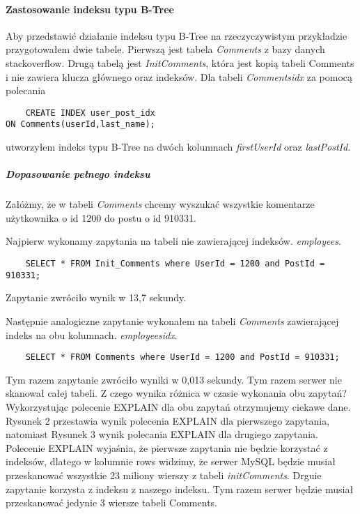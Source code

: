 \paragraph{Zastosowanie indeksu typu B-Tree}\mbox{}

Aby przedstawić działanie indeksu typu B-Tree na rzeczyczywistym przykładzie przygotowałem dwie tabele. Pierwszą jest tabela \textit{Comments} z bazy danych stackoverflow. Drugą tabelą jest \textit{Init\textunderscore Comments}, która jest kopią tabeli Comments i nie zawiera klucza głównego oraz indeksów.
Dla tabeli \textit{Comments\textunderscore idx} za pomocą polecania \begin{verbatim}
    CREATE INDEX user_post_idx 
ON Comments(userId,last_name);
\end{verbatim}
utworzyłem indeks typu B-Tree na dwóch kolumnach \textit{first\textunderscore UserId} oraz \textit{last\textunderscore PostId}.

\subparagraph{Dopasowanie pełnego indeksu}\mbox{}

Załóżmy, że w tabeli \textit{Comments} chcemy wyszukać wszystkie komentarze użytkownika o id 1200 do postu o id 910331.

Najpierw wykonamy zapytania na tabeli nie zawierającej indeksów.
 \textit{employees}. 
\begin{verbatim}
    SELECT * FROM Init_Comments where UserId = 1200 and PostId = 910331;
\end{verbatim}
Zapytanie zwróciło wynik w 13,7 sekundy.

Następnie analogiczne zapytanie wykonałem na tabeli \textit{Comments} zawierającej indeks na obu kolumnach.
\textit{employees\textunderscore idx}. 
\begin{verbatim}
    SELECT * FROM Comments where UserId = 1200 and PostId = 910331;
\end{verbatim}
Tym razem zapytanie zwróciło wyniki w 0,013 sekundy. Tym razem serwer nie skanował całej tabeli. Z czego wynika różnica w czasie wykonania obu zapytań? Wykorzystując polecenie EXPLAIN dla obu zapytań otrzymujemy ciekawe dane. Rysunek 2 przestawia wynik polecenia EXPLAIN dla pierwszego zapytania, natomiast Rysunek 3 wynik polecania EXPLAIN dla drugiego zapytania. Polecenie EXPLAIN wyjaśnia, że pierwsze zapytania nie będzie korzystać z indeksów, dlatego w kolumnie rows widzimy, że serwer MySQL będzie musiał przeskanować wszystkie 23 miliony wierszy z tabeli \textit{init\textunderscore Comments}. Drguie zapytanie korzysta z indeksu z naszego indeksu. Tym razem serwer będzie musiał przeskanować jedynie 3 wiersze tabeli Comments. 

